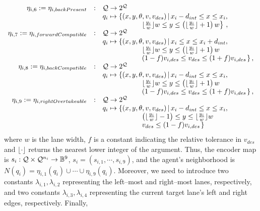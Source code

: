 \begin{equation*}
\begin{array}{rcl}
%
\eta_{i,6} := \eta_{i, backPresent} & : & \Q \rightarrow 2^\Q \\
& & q_i \mapsto \left\lbrace (x,y,\theta, v, v_{des}) \, | \, x_i-d_{int} \leq x \leq x_i, \right. \\ & & \;\;\;\;\;\;\;\;\;\;\;\;\;\;\;\;\;\;\;\; \left. \lfloor \frac{y_i}{w} \rfloor w \leq y \leq \left( \lfloor \frac{y_i}{w} \rfloor + 1 \right) w \right\rbrace \, , \\
%
\eta_{i,7} := \eta_{i, forwardCompatible} & : & \Q \rightarrow 2^\Q \\
& & q_i \mapsto \left\lbrace (x,y,\theta, v, v_{des}) \, | \, x_i \leq x \leq x_i + d_{int}, \right. \\ 
 & & \;\;\;\;\;\;\;\;\;\;\;\;\;\;\;\;\;\;\;\; 
\left. \lfloor \frac{y_i}{w} \rfloor w \leq y \leq \left( \lfloor \frac{y_i}{w} \rfloor + 1 \right) w \right. \\ 
& & \;\;\;\;\;\;\;\;\;\;\;\;\;\;\;\;\;\;\;\;
\left. (1 - f)v_{i, des} \leq v_{des} \leq (1+f)v_{i, des} \right.
\rbrace \, , \\
%
\eta_{i,8} := \eta_{i, backCompatible} & : & \Q \rightarrow 2^\Q \\
& & q_i \mapsto \left\lbrace (x,y,\theta, v, v_{des}) \, | \, x_i - d_{int}\leq x \leq x_i, \right. \\ 
 & & \;\;\;\;\;\;\;\;\;\;\;\;\;\;\;\;\;\;\;\; 
\left. \lfloor \frac{y_i}{w} \rfloor w \leq y \leq \left( \lfloor \frac{y_i}{w} \rfloor + 1 \right) w \right. \\ 
& & \;\;\;\;\;\;\;\;\;\;\;\;\;\;\;\;\;\;\;\;
\left. (1 - f)v_{i, des} \leq v_{des} \leq (1+f)v_{i, des} \right.
\rbrace \, , \\
%
\eta_{i,9} := \eta_{i, rightOvertakeable} & : & \Q \rightarrow 2^\Q \\
& & q_i \mapsto \left\lbrace (x,y,\theta, v, v_{des}) \, | \, x_i - d_{int}\leq x \leq x_i, \right. \\ 
 & & \;\;\;\;\;\;\;\;\;\;\;\;\;\;\;\;\;\;\;\; 
\left. \left( \lfloor \frac{y_i}{w} \rfloor - 1 \right) \leq y \leq \lfloor \frac{y_i}{w} \rfloor w \right. \\ 
& & \;\;\;\;\;\;\;\;\;\;\;\;\;\;\;\;\;\;\;\;
\left. v_{des} \leq (1-f)v_{i, des} \right.
\rbrace \,  \\

 
 
\end{array}
\end{equation*}
where $w$ is the lane width, {\color{red}$f$ is a constant indicating the relative tolerance in $v_{des}$} and $\lfloor \cdot \rfloor$ returns the nearest lower integer of the argument. Thus, the encoder map is $s_i :  \mathcal{Q} \times \mathcal{Q}^{n_i} \rightarrow \Bbb{B}^9$, $s_i = (s_{i,1}, \cdots, s_{i,9})$, and the agent's neighborhood is $N(q_i) = \eta_{i,1}(q_i) \cup \cdots \cup \eta_{i,9}(q_i)$. Moreover, we need to introduce two constants $\lambda_{i,1}, \lambda_{i,2}$ representing the left--most and right--most lanes, respectively, and two constants $\lambda_{i,3}, \lambda_{i,4}$ representing the current target lane's left and right edges, respectively. Finally, 
